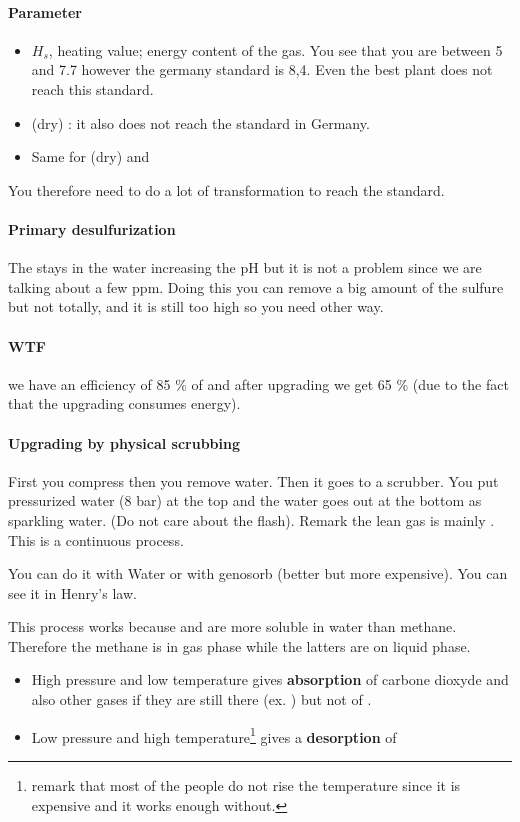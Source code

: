 \documentclass[10pt,a4paper]{article}
\begin{document}
\paragraph{Parameter}

\begin{itemize}
\item $H_s$, heating value; energy content of the gas. You see that you are between 5 and 7.7 however the germany standard is 8,4. Even the best plant does not reach this standard.
\item {} (dry) : it also does not reach the standard in Germany.   
\item Same for  (dry) and 
\end{itemize}
You therefore need to do a lot of transformation to reach the standard.

\paragraph{Primary desulfurization}  The  stays in the water increasing the pH but it is not a problem since we are talking about a few ppm. Doing this you can remove a big amount of the sulfure but not totally, and it is still too high so you need other way.
\paragraph{WTF} we have an efficiency of 85 \% of  and after upgrading we get 65 \% (due to the fact that the upgrading consumes energy).

\paragraph{Upgrading by physical scrubbing} First you compress then you remove water. Then it goes to a scrubber. You put pressurized water (8 bar) at the top and the water goes out at the bottom as sparkling water. (Do not care about the flash). Remark the lean gas is mainly . This is a continuous process.

You can do it with Water or with genosorb (better but more expensive). You can see it in Henry's law.

This process works because  and  are more soluble in water than methane. Therefore the methane is in gas phase while the latters are on liquid phase.

\begin{itemize}

\item High pressure and low temperature gives \textbf{absorption} of carbone dioxyde and also other gases if they are still there (ex. ) but not of .
\item Low pressure and high temperature\footnote{remark that most of the people do not rise the temperature since it is expensive and it works enough without.} gives a \textbf{desorption} of 
\end{itemize}
\end{document}
